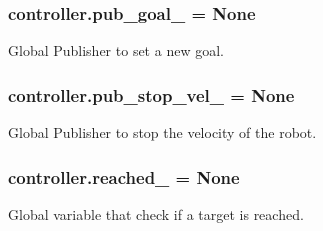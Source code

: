 \subsubsection[{\texorpdfstring{pub\+\_\+goal\+\_\+}{pub_goal_}}]{\setlength{\rightskip}{0pt plus 5cm}controller.\+pub\+\_\+goal\+\_\+ = None}\hypertarget{namespacecontroller_a4937e30f10eec1bb2642391fd378d973}{}\label{namespacecontroller_a4937e30f10eec1bb2642391fd378d973}


Global Publisher to set a new goal. 

\subsubsection[{\texorpdfstring{pub\+\_\+stop\+\_\+vel\+\_\+}{pub_stop_vel_}}]{\setlength{\rightskip}{0pt plus 5cm}controller.\+pub\+\_\+stop\+\_\+vel\+\_\+ = None}\hypertarget{namespacecontroller_a4eff46b5a67216f8bf8eb3d09ca4aea1}{}\label{namespacecontroller_a4eff46b5a67216f8bf8eb3d09ca4aea1}


Global Publisher to stop the velocity of the robot. 

\subsubsection[{\texorpdfstring{reached\+\_\+}{reached_}}]{\setlength{\rightskip}{0pt plus 5cm}controller.\+reached\+\_\+ = None}\hypertarget{namespacecontroller_a240640e002c30765d0b09505fc64f5e7}{}\label{namespacecontroller_a240640e002c30765d0b09505fc64f5e7}


Global variable that check if a target is reached. 

